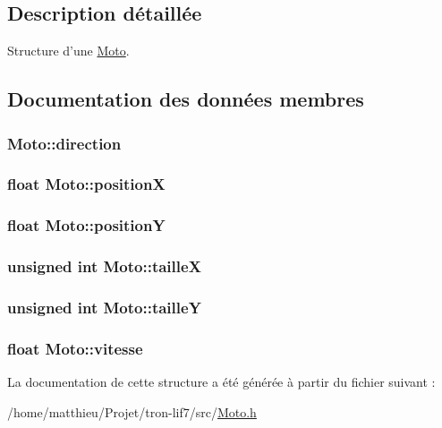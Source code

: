 \subsection{Description détaillée}
Structure d'une \hyperlink{structMoto}{Moto}. 

\subsection{Documentation des données membres}
\hypertarget{structMoto_ace42f991dc2d223029ca7f7162a10e9b}{
\subsubsection[{direction}]{ Moto\-::direction}}\label{structMoto_ace42f991dc2d223029ca7f7162a10e9b}
\hypertarget{structMoto_a7d9695eb69a7161d1a6800e4b8bc4170}{
\subsubsection[{position\-X}]{\setlength{\rightskip}{0pt plus 5cm}float Moto\-::position\-X}}\label{structMoto_a7d9695eb69a7161d1a6800e4b8bc4170}
\hypertarget{structMoto_a68859bbff76786aedccab8093a9de5a8}{
\subsubsection[{position\-Y}]{\setlength{\rightskip}{0pt plus 5cm}float Moto\-::position\-Y}}\label{structMoto_a68859bbff76786aedccab8093a9de5a8}
\hypertarget{structMoto_a15d1b56209aba6ea0bc8eeaac82ae625}{
\subsubsection[{taille\-X}]{\setlength{\rightskip}{0pt plus 5cm}unsigned int Moto\-::taille\-X}}\label{structMoto_a15d1b56209aba6ea0bc8eeaac82ae625}
\hypertarget{structMoto_ab7b358839b7d20f16a4a17e5eabad5a4}{
\subsubsection[{taille\-Y}]{\setlength{\rightskip}{0pt plus 5cm}unsigned int Moto\-::taille\-Y}}\label{structMoto_ab7b358839b7d20f16a4a17e5eabad5a4}
\hypertarget{structMoto_a561dfc3e54a534dfa92ccecbea8dbe71}{
\subsubsection[{vitesse}]{\setlength{\rightskip}{0pt plus 5cm}float Moto\-::vitesse}}\label{structMoto_a561dfc3e54a534dfa92ccecbea8dbe71}


La documentation de cette structure a été générée à partir du fichier suivant \-:\begin{DoxyCompactItemize}
\item 
/home/matthieu/\-Projet/tron-\/lif7/src/\hyperlink{Moto_8h}{Moto.\-h}\end{DoxyCompactItemize}
